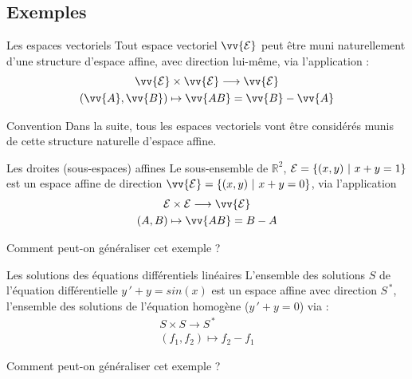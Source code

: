 \documentclass[
bigger]{m53beamer}
\begin{document}
\subsection{Exemples}
  \begin{frame}{Les espaces vectoriels}
    Tout espace vectoriel $\vv{\ens{E}}$ peut être muni naturellement d'une structure d'espace affine, avec direction lui-même, via l'application :
    \begin{gather*}
      \vv{\ens{E}} \times \vv{\ens{E}} \longrightarrow \vv{\ens{E}}\\
      (\vv{A},\vv{B}) \mapsto \vv{AB}=\vv{B}-\vv{A}
    \end{gather*}\pause
    \begin{block}{Convention}
      Dans la suite, tous les espaces vectoriels vont être considérés munis de cette structure naturelle d'espace affine.
    \end{block}
  \end{frame}
  \begin{frame}{Les droites (sous-espaces) affines}
    Le sous-ensemble de $\mathbb{R}^{2}$, $\mathcal{E}=\{(x,y)\ |\ x+y=1 \}$ est un espace affine de direction $\vv{\ens{E}}=\{(x,y)\ |\ x+y=0 \}$, via l'application
    \begin{gather*}
      \ens{E} \times \ens{E} \longrightarrow \vv{\ens{E}}\\
      (A,B) \mapsto \vv{AB}=B-A
    \end{gather*}\pause
    \begin{question}
      Comment peut-on généraliser cet exemple ?
    \end{question}
  \end{frame}
  \begin{frame}{Les solutions des équations différentiels linéaires}
    L'ensemble des solutions $S$ de l'équation différentielle $y\,'+y=sin(x)$ est un espace affine avec direction $S^{\,\ast}$, l'ensemble des solutions de l'équation homogène ($y\,'+y=0$) via :
    \begin{gather*}
      S \times S \longrightarrow S^{\,\ast}\\
      (f_{1},f_{2}) \mapsto f_{2}-f_{1}
    \end{gather*}\pause
    \begin{question}
      Comment peut-on généraliser cet exemple ?
    \end{question}
  \end{frame}
\end{document}
